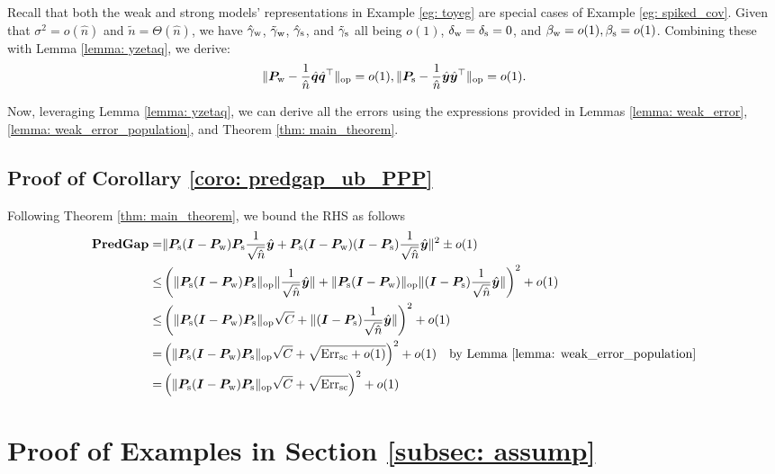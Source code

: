 Recall that both the weak and strong models' representations in Example \ref{eg: toyeg} are special cases of Example \ref{eg: spiked_cov}. Given that $\sigma^2 = o(\hat{n})$ and $\tilde{n} = \Theta(\hat{n})$, we have $\hat{\gamma}_{\text{w}}$, $\tilde{\gamma}_{\text{w}}$, $\hat{\gamma}_{\text{s}}$, and $\tilde{\gamma}_{\text{s}}$ all being $o(1)$, $\delta_{\text{w}}=\delta_{\text{s}}=0$, and $\beta_{\text{w}}=o(1), \beta_{\text{s}}=o(1)$. Combining these with Lemma \ref{lemma: yzetaq}, we derive:
\begin{align}
    \nonumber
\lVert  {\bm{P}}_{\text{w}} - \frac{1}{\hat{n}}\hat{{\bm{q}}}\hat{{\bm{q}}}^\top \rVert_{\mathrm{op}} = o(1), 
\lVert  {\bm{P}}_{\text{s}} - \frac{1}{\hat{n}}\hat{{\bm{y}}}\hat{{\bm{y}}}^\top \rVert_{\mathrm{op}} = o(1). 
\end{align}

Now, leveraging Lemma \ref{lemma: yzetaq}, we can derive all the errors using the expressions provided in Lemmas \ref{lemma: weak_error}, \ref{lemma: weak_error_population}, and Theorem \ref{thm: main_theorem}. 


\subsection{Proof of Corollary \ref{coro: predgap_ub_PPP}}\label{apdx: proof_PPP}

Following Theorem \ref{thm: main_theorem}, we bound the RHS as follows
\begin{align}
    \nonumber
    \textbf{PredGap}{} = & \| {\bm{P}}_{\text{s}}({\bm{I}}-{\bm{P}}_{\text{w}}){\bm{P}}_{\text{s}} \frac{1}{\sqrt{\hat{n}}} \hat{{\bm{y}}}+ {\bm{P}}_{\text{s}}({\bm{I}}-{\bm{P}}_{\text{w}}) ( 
{\bm{I}}- {\bm{P}}_{\text{s}})\frac{1}{\sqrt{\hat{n}}} \hat{{\bm{y}}} \|^2 \pm o(1)\\
\leq & \left( \lVert  {\bm{P}}_{\text{s}}({\bm{I}}-{\bm{P}}_{\text{w}})  {\bm{P}}_{\text{s}} \rVert_{\mathrm{op}} \|\frac{1}{\sqrt{\hat{n}}} \hat{{\bm{y}}}\|+ \lVert {\bm{P}}_{\text{s}}({\bm{I}}-{\bm{P}}_{\text{w}}) \rVert_{\mathrm{op}} \|( 
{\bm{I}}- {\bm{P}}_{\text{s}})\frac{1}{\sqrt{\hat{n}}} \hat{{\bm{y}}} \|\right)^2 + o(1) \\
\nonumber
\leq & \left(\lVert  {\bm{P}}_{\text{s}}({\bm{I}}-{\bm{P}}_{\text{w}})  {\bm{P}}_{\text{s}} \rVert_{\mathrm{op}} \sqrt{C} +  \|( 
{\bm{I}}- {\bm{P}}_{\text{s}})\frac{1}{\sqrt{\hat{n}}} \hat{{\bm{y}}} \|\right)^2 + o(1) \\
\nonumber
= & \left(\lVert  {\bm{P}}_{\text{s}}({\bm{I}}-{\bm{P}}_{\text{w}})  {\bm{P}}_{\text{s}} \rVert_{\mathrm{op}} \sqrt{C} +  \sqrt{\text{Err}_{\text{sc}} +o(1) } \right)^2 + o(1) \quad\text{by Lemma \ref{lemma: weak_error_population}} \\
\nonumber
= & \left( \lVert  {\bm{P}}_{\text{s}}({\bm{I}}-{\bm{P}}_{\text{w}})  {\bm{P}}_{\text{s}} \rVert_{\mathrm{op}} \sqrt{C} +  \sqrt{\text{Err}_{\text{sc}} } \right)^2 + o(1) \quad
\end{align}


\section{Proof of Examples in Section \ref{subsec: assump}}


